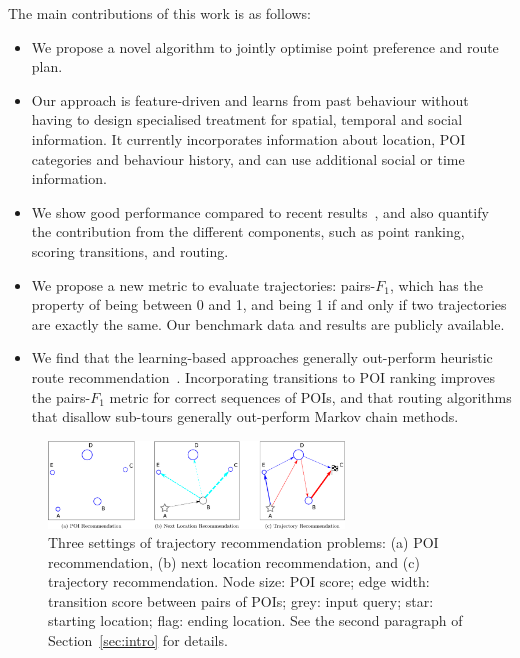 The main contributions of this work is as follows:
\begin{itemize}
\setlength{\itemsep}{-2pt}
\item We propose a novel algorithm to jointly optimise point preference and route plan.
\item Our approach is feature-driven and learns from past behaviour without having to design specialised treatment for spatial, temporal and social information. It currently incorporates information about location, POI categories and behaviour history, and can use additional social or time information.%
\item We show good performance compared to recent results~\cite{ijcai15}, and also quantify the contribution from the different components, such as point ranking, scoring transitions, and routing.
\item We propose a new metric to evaluate trajectories: pairs-$F_1$, which has the property of being between 0 and 1, and being 1 if and only if two trajectories are exactly the same. Our benchmark data and results are publicly available.
\item We find that the learning-based approaches generally out-perform heuristic route recommendation~\cite{ijcai15}. Incorporating transitions to POI ranking improves the pairs-$F_1$ metric for correct sequences of POIs, and that routing algorithms that disallow sub-tours generally out-perform Markov chain methods.
\end{itemize}

\begin{figure}[ht]
	\centering
	\includegraphics[width=0.7\textwidth]{fig/fig1-flavours.pdf}
	\caption{Three settings of trajectory recommendation problems: (a) POI recommendation, (b) next location recommendation, and (c) trajectory recommendation. Node size: POI score; edge width: transition score between pairs of POIs; grey: input query; star: starting location; flag: ending location. See the second paragraph of Section~\ref{sec:intro} for details.
}
	\label{fig:threesettings}
\end{figure}
